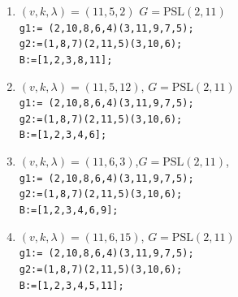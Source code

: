 \documentclass[a4paper,twopage,reqno,12pt]{amsart}
\theoremstyle{definition}
\numberwithin{equation}{section}
\newcommand{\PSL}{\mathrm{PSL}}
\newcommand{\PGL}{\mathrm{PGL}}
\newcommand{\Aut}{\mathrm{Aut}}
\begin{document}
\begin{enumerate}
    \item \label{1152}$(v,k,\lambda)=(11,5,2)$ $G=\PSL(2,11)$\\
    \texttt{g1:= (2,10,8,6,4)(3,11,9,7,5);}\\
    \texttt{g2:=(1,8,7)(2,11,5)(3,10,6);}\\
    \texttt{B:=[1,2,3,8,11];}\\

    \item \label{11512}$(v,k,\lambda)=(11,5,12)$, $G=\PSL(2,11)$\\
    \texttt{g1:= (2,10,8,6,4)(3,11,9,7,5);}\\
    \texttt{g2:=(1,8,7)(2,11,5)(3,10,6);}\\
    \texttt{B:=[1,2,3,4,6];}\\

    \item\label{1163}$(v,k,\lambda)=(11,6,3)$,$G=\PSL(2,11)$, \\
    \texttt{g1:= (2,10,8,6,4)(3,11,9,7,5);}\\
    \texttt{g2:=(1,8,7)(2,11,5)(3,10,6);}\\
    \texttt{B:=[1,2,3,4,6,9];}\\


    \item\label{11615}$(v,k,\lambda)=(11,6,15)$, $G=\PSL(2,11)$\\
    \texttt{g1:= (2,10,8,6,4)(3,11,9,7,5);}\\
    \texttt{g2:=(1,8,7)(2,11,5)(3,10,6);}\\
    \texttt{B:=[1,2,3,4,5,11];}\\



\end{enumerate}
\end{document}
